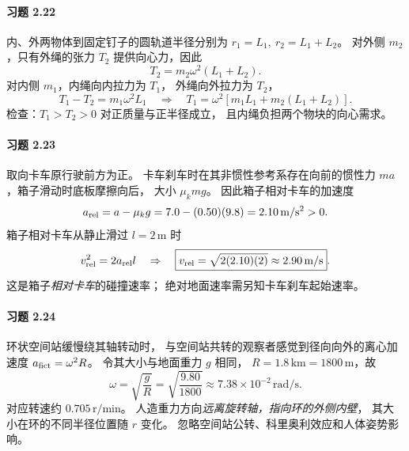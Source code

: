 \paragraph{习题 2.22}
内、外两物体到固定钉子的圆轨道半径分别为
\(r_1=L_1,\ r_2=L_1+L_2\)。
对外侧 \(m_2\)，只有外绳的张力
\(T_2\) 提供向心力，因此
\[
 \boxed{T_2=m_2\omega^2(L_1+L_2)}.
\]
对内侧 \(m_1\)，内绳向内拉力为 \(T_1\)，
外绳向外拉力为 \(T_2\)，
\[
 T_1-T_2=m_1\omega^2L_1
 \quad\Rightarrow\quad
 \boxed{T_1=\omega^2[
 m_1L_1+m_2(L_1+L_2)]}.
\]
检查：\(T_1>T_2>0\) 对正质量与正半径成立，
且内绳负担两个物块的向心需求。

\paragraph{习题 2.23}
取向卡车原行驶前方为正。
卡车刹车时在其非惯性参考系存在向前的惯性力
\(ma\)，箱子滑动时底板摩擦向后，
大小 \(\mu_kmg\)。
因此箱子相对卡车的加速度
\[
 a_{\rm rel}=a-\mu_kg
 =7.0-(0.50)(9.8)=2.10\,\mathrm{m/s^2}>0.
\]
箱子相对卡车从静止滑过 \(l=2\,\mathrm m\) 时
\[
 v_{\rm rel}^2=2a_{\rm rel}l
 \quad\Rightarrow\quad
 \boxed{v_{\rm rel}=\sqrt{2(2.10)(2)}
 \approx2.90\,\mathrm{m/s}}.
\]
这是箱子\emph{相对卡车}的碰撞速率；
绝对地面速率需另知卡车刹车起始速率。

\paragraph{习题 2.24}
环状空间站缓慢绕其轴转动时，
与空间站共转的观察者感觉到径向向外的离心加速度
\(a_{\rm fict}=\omega^2R\)。
令其大小与地面重力 \(g\) 相同，
\(R=1.8\,\mathrm{km}=1800\,\mathrm m\)，故
\[
 \boxed{\omega=\sqrt{\frac gR}
 =\sqrt{\frac{9.80}{1800}}
 \approx7.38\times10^{-2}\,\mathrm{rad/s}}.
\]
对应转速约 \(0.705\,\mathrm{r/min}\)。
人造重力方向\emph{远离旋转轴，指向环的外侧内壁}，
其大小在环的不同半径位置随 \(r\) 变化。
忽略空间站公转、科里奥利效应和人体姿势影响。


